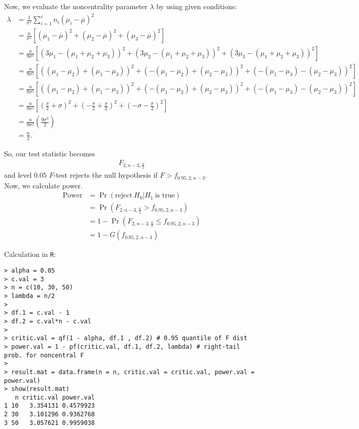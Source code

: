 \documentclass[a4paper]{article}
\begin{document}
Now, we evaluate the noncentrality parameter $\lambda$ by using given conditions:
\begin{align*}
\lambda &= \frac{1}{\sigma^2} \sum_{i=1}^{c} n_{i}\left(\mu_{i} - \overline{\mu}\right)^2\\
&= \frac{n}{\sigma^2}\left[\left(\mu_{1} - \overline{\mu}\right)^2 + \left(\mu_{2} - \overline{\mu}\right)^2 + \left(\mu_{3} - \overline{\mu}\right)^2 \right]\\
&= \frac{n}{9\sigma^2}\left[\left(3\mu_{1} - (\mu_{1} + \mu_{2} + \mu_{3})\right)^2 + \left(3\mu_{2} - (\mu_{1} + \mu_{2} + \mu_{3})\right)^2 + \left(3\mu_{3} - (\mu_{1} + \mu_{2} + \mu_{3})\right)^2 \right]\\
&= \frac{n}{9\sigma^2}\left[\left( (\mu_{1} - \mu_{2}) + (\mu_{1} - \mu_{3}) \right)^2 + \left( -(\mu_{1} - \mu_{2}) + (\mu_{2} - \mu_{3}) \right)^2 + \left( -(\mu_{1} - \mu_{3}) - (\mu_{2} - \mu_{3}) \right)^2 \right]\\
&= \frac{n}{9\sigma^2}\left[\left( (\mu_{1} - \mu_{2}) + (\mu_{1} - \mu_{3}) \right)^2 + \left( -(\mu_{1} - \mu_{2}) + (\mu_{2} - \mu_{3}) \right)^2 + \left( -(\mu_{1} - \mu_{3}) - (\mu_{2} - \mu_{3}) \right)^2 \right]\\
&= \frac{n}{9\sigma^2}\left[\left(\frac{\sigma}{2} + \sigma \right)^2 + \left(-\frac{\sigma}{2} + \frac{\sigma}{2} \right)^2 + \left(-\sigma -\frac{\sigma}{2} \right)^2  \right]\\
&= \frac{n}{9\sigma^2}\left(\frac{9\sigma^2}{2} \right)\\
&= \frac{n}{2}.
\end{align*}


So, our test statistic becomes
\begin{align*}
F_{2,n-3,\frac{n}{2}}
\end{align*}
and level $0.05$ $F$-test rejects the null hypothesis if  $F > f_{0.95, 2, n-3}$.\\

Now, we calculate power.
\begin{align*}
\mbox{Power} &= \Pr\left(\mbox{reject}~H_{0}|H_{1}~\mbox{is true}\right)\\
&= \Pr\left(F_{2,n-3,\frac{n}{2}} > f_{0.95, 2, n-3}\right)\\
&= 1 - \Pr\left(F_{2,n-3,\frac{n}{2}} \leq f_{0.95, 2, n-3}\right)\\
&= 1 - G\left(f_{0.95, 2, n-3}\right)
\end{align*}

Calculation in \texttt{R}:
\begin{lstlisting}
> alpha = 0.05
> c.val = 3
> n = c(10, 30, 50)
> lambda = n/2
> 
> df.1 = c.val - 1
> df.2 = c.val*n - c.val
> 
> critic.val = qf(1 - alpha, df.1 , df.2) # 0.95 quantile of F dist
> power.val = 1 - pf(critic.val, df.1, df.2, lambda) # right-tail prob. for noncentral F
> 
> result.mat = data.frame(n = n, critic.val = critic.val, power.val = power.val)
> show(result.mat)
   n critic.val power.val
1 10   3.354131 0.4579923
2 30   3.101296 0.9362768
3 50   3.057621 0.9959038
\end{lstlisting}
\end{document}
